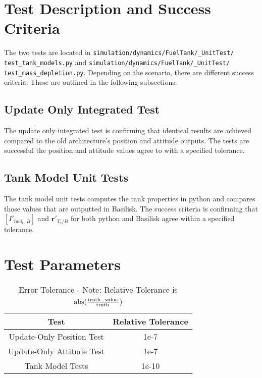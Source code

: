 

\section{Test Description and Success Criteria}
The two tests are located in \texttt{simulation/dynamics/FuelTank/\_UnitTest/\newline
test\_tank\_models.py} and \texttt{simulation/dynamics/FuelTank/\_UnitTest/\newline
test\_mass\_depletion.py}. Depending on the scenario, there are different success criteria. These are outlined in the following subsections:
\subsection{Update Only Integrated Test}

The update only integrated test is confirming that identical results are achieved compared to the old architecture's position and attitude outputs. The tests are successful the position and attitude values agree to with a specified tolerance.

\subsection{Tank Model Unit Tests}

The tank model unit tests computes the tank properties in python and compares those values that are outputted in Basilisk. The success criteria is confirming that $\left[I'_{\text{fuel}_i,\,B}\right]$ and $\bm r'_{T_c/B}$ for both python and Basilisk agree within a specified tolerance.

\section{Test Parameters}

\begin{table}[htbp]
	\caption{Error Tolerance - Note: Relative Tolerance is $\textnormal{abs}(\frac{\textnormal{truth} - \textnormal{value}}{\textnormal{truth}}$)}
	\label{tab:errortol}
	\centering \fontsize{10}{10}\selectfont
	\begin{tabular}{| c | c |} %
		\hline
		Test   & Relative Tolerance \\
		\hline
		Update-Only Position Test  & 1e-7 \\
		\hline
		Update-Only Attitude Test  & 1e-7 \\
		\hline
		Tank Model Tests & 1e-10 \\
		\hline	
	\end{tabular}
\end{table}

